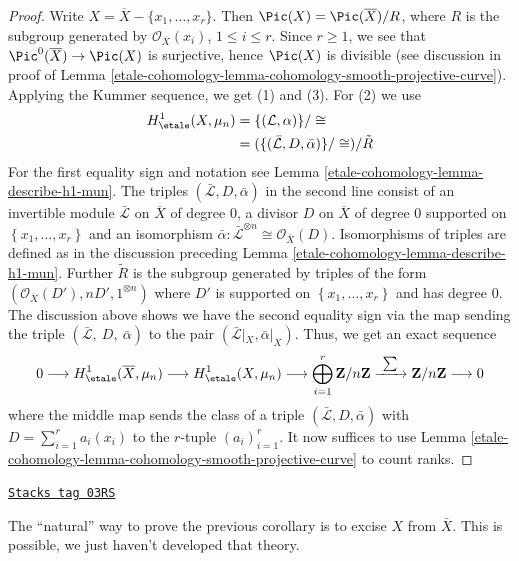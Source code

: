 \begin{proof}
Write $X = \overline{X} - \{ x_1, \ldots, x_r\}$. Then
$\Pic(X) = \Pic(\overline{X})/ R$, where $R$ is the subgroup generated by
$\mathcal{O}_{\overline{X}}(x_i)$, $1 \leq i \leq r$.
Since $r \geq 1$, we see that $\Pic^0(\overline{X}) \to \Pic(X)$
is surjective, hence $\Pic(X)$ is divisible (see discussion in proof
of Lemma \ref{etale-cohomology-lemma-cohomology-smooth-projective-curve}).
Applying the Kummer sequence, we get (1) and (3). For (2) we use
\begin{align*}
H_\etale^1(X, \mu_n)
& =
\{(\mathcal L, \alpha)\}/\cong \\
& =
(\{(\bar{\mathcal L}, D, \bar \alpha)\}/\cong)/\tilde{R}
\end{align*}
For the first equality sign and notation see Lemma \ref{etale-cohomology-lemma-describe-h1-mun}.
The triples $(\bar{\mathcal L}, D, \bar \alpha)$ in the second line
consist of an invertible module $\bar{\mathcal L}$ on $\overline{X}$
of degree $0$, a divisor $D$ on $\overline{X}$ of degree $0$ supported on
$\left\{x_1, \ldots, x_r\right\}$ and an isomorphism
$\bar{\alpha}: \bar{\mathcal L}^{\otimes n} \cong \mathcal{O}_{\bar{X}}(D)$.
Isomorphisms of triples are defined as in the discussion preceding
Lemma \ref{etale-cohomology-lemma-describe-h1-mun}.
Further $\tilde{R}$ is the subgroup generated by triples of the form
$(\mathcal{O}_{\overline{X}}(D'), n D', 1^{\otimes n})$
where $D'$ is supported on $\left\{x_1, \ldots, x_r\right\}$ and has degree 0.
The discussion above shows we have the second equality sign via
the map sending the triple $(\bar{\mathcal L},\ D,\ \bar \alpha)$
to the pair $(\bar{\mathcal L}|_X, \bar \alpha|_X)$. Thus,
we get an exact sequence
$$
0 \longrightarrow
H_\etale^1(\overline{X}, \mu_n) \longrightarrow
H_\etale^1(X, \mu_n) \longrightarrow
\bigoplus_{i = 1}^r \mathbf{Z}/n\mathbf{Z}
\xrightarrow{\ \sum\ }
\mathbf{Z}/n\mathbf{Z} \longrightarrow 0
$$
where the middle map sends the class of a triple
$(\bar{ \mathcal L}, D, \bar \alpha)$ with $D = \sum_{i = 1}^r a_i (x_i)$
to the $r$-tuple $(a_i)_{i = 1}^r$. It now suffices to use
Lemma \ref{etale-cohomology-lemma-cohomology-smooth-projective-curve}
to count ranks.
\end{proof}

\begin{remark}
\label{etale-cohomology-remark-natural-proof}
\href{https://stacks.math.columbia.edu/tag/03RS}{\texttt{Stacks tag 03RS}}

The ``natural'' way to prove the previous corollary is to excise $X$ from $\bar
X$. This is possible, we just haven't developed that theory.
\end{remark}

